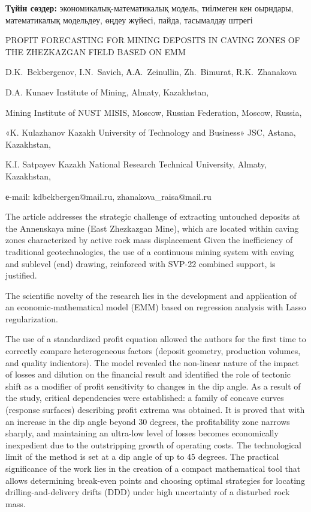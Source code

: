 {\bfseries Түйін сөздер:} экономикалық-математикалық модель, тиілмеген кен
оырндары, математикалық модельдеу, өңдеу жүйесі, пайда, тасымалдау
штрегі
\vspace{1em}
\begin{header}
PROFIT FORECASTING FOR MINING DEPOSITS IN CAVING ZONES OF THE ZHEZKAZGAN FIELD BASED ON EMM

D.K.~Bekbergenov\envelope,
I.N.~Savich,
А.А.~Zeinullin,
Zh.~Bimurat,
R.K.~Zhanakova\envelope
\end{header}

\begin{affil}
D.A. Kunaev Institute of Mining, Almaty, Kazakhstan,

Mining Institute of NUST MISIS, Moscow, Russian Federation, Moscow, Russia,

«K. Kulazhanov Kazakh University of Technology and Business» JSC, Astana, Kazakhstan,

K.I. Satpayev Kazakh National Research Technical University, Almaty, Kazakhstan,

е-mail: kdbekbergen@mail.ru, zhanakova\_raisa@mail.ru
\end{affil}

The article addresses the strategic challenge of extracting untouched
deposits at the Annenskaya mine (East Zhezkazgan Mine), which are
located within caving zones characterized by active rock mass
dis\-placement Given the inefficiency of traditional geotechnologies, the
use of a continuous mining system with caving and sublevel (end)
drawing, reinforced with SVP-22 combined support, is justified.

The scientific novelty of the research lies in the development and
application of an economic-mathema\-tical model (EMM) based on regression
analysis with Lasso regularization.

The use of a standardized profit equation allowed the authors for the
first time to correctly compare heterogeneous factors (deposit geometry,
production volumes, and quality indicators). The model revealed the
non-linear nature of the impact of losses and dilution on the financial
result and identified the role of tectonic shift as a modifier of profit
sensitivity to changes in the dip angle. As a result of the study,
critical dependencies were established: a family of concave curves
(response surfaces) describing profit extrema was obtained. It is proved
that with an increase in the dip angle beyond 30 degrees, the
profitability zone narrows sharply, and maintaining an ultra-low level
of losses becomes economically inexpedient due to the outstripping
growth of operating costs. The technological limit of the method is set
at a dip angle of up to 45 degrees. The practical significance of the
work lies in the creation of a compact mathematical tool that allows
determining break-even points and choosing optimal strategies for
locating drilling-and-delivery drifts (DDD) under high uncertainty of a
disturbed rock mass.

